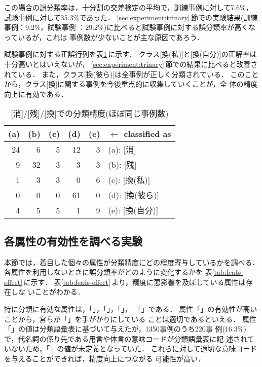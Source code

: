 この場合の誤分類率は，十分割の交差検定の平均で，訓練事例に対して7.6\%，
試験事例に対して35.3\%であった．
\ref{sec:experiment:trinary}\,節での実験結果(訓練事例：9.2\%，試験事例
：29.2\%)に比べると試験事例に対する誤分類率が高くなっているが，これは
事例数が少ないことが主な原因であろう．

試験事例に対する正誤行列を表\ref{tab:confusion_matrix3}\,に示す．
クラス[換(私)]と[換(自分)]の正解率は十分高いとはいえないが，
\ref{sec:experiment:trinary}\,節での結果に比べると改善されている．
また，クラス[換(彼ら)]は全事例が正しく分類されている．
このことから，クラス[換]に関する事例を今後重点的に収集していくことが，全
体の精度向上に有効である．
\begin{table}[htbp]
\caption{[消]/[残]/[換]での分類精度(ほぼ同じ事例数)}
\label{tab:confusion_matrix3}
\begin{center}
\begin{tabular}{|r|r|r|r|r|l|}\hline
\multicolumn{1}{|c|}{(a)} & \multicolumn{1}{c|}{(b)} &
\multicolumn{1}{|c|}{(c)} & \multicolumn{1}{c|}{(d)} &
\multicolumn{1}{|c|}{(e)} & $\leftarrow$ classified as \\\hline\hline
24 &  6 & 5 & 12 & 3 & (a): [消] \\
 9 & 32 & 3 &  3 & 3 & (b): [残] \\
 1 &  3 & 3 &  0 & 6 & (c): [換(私)] \\
 0 &  0 & 0 & 61 & 0 & (d): [換(彼ら)] \\
 4 &  5 & 5 &  1 & 9 & (e): [換(自分)] \\\hline
\end{tabular}
\end{center}
\end{table}

\subsection{各属性の有効性を調べる実験}

本節では，着目した個々の属性が分類精度にどの程度寄与しているかを調べる．
各属性を利用しないときに誤分類率がどのように変化するかを
表\ref{tab:feats-effect}\,に示す．
表\ref{tab:feats-effect}\,より，精度に悪影響を及ぼしている属性は存在しな
いことがわかる．

特に分類に有効な属性は，「\PRON」，「\GVNRSEM」，「\GVNRFZKG」，
「\CLSENDF」である．
属性「\PRON」の有効性が高いことから，宮らが「\PRON」を手がかりにしている
ことは適切であるといえる．
属性「\GVNRSEM」の値は分類語彙表に基づいて与えたが，1350事例のうち220事
例(16.3\%)で，代名詞の係り先である用言や体言の意味コードが分類語彙表に記
述されていないため，「\GVNRSEM」の値が未定義となっていた．
これらに対して適切な意味コードを与えることができれば，精度向上につながる
可能性が高い．

